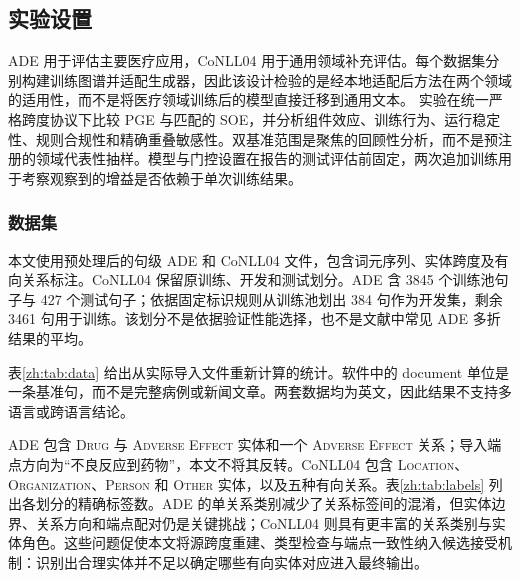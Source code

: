\documentclass[UTF8,a4paper,twocolumn,10pt]{ctexart}
\begin{document}
\subsection{实验设置}
ADE 用于评估主要医疗应用，CoNLL04 用于通用领域补充评估。每个数据集分别构建训练图谱并适配生成器，因此该设计检验的是经本地适配后方法在两个领域的适用性，而不是将医疗领域训练后的模型直接迁移到通用文本。
实验在统一严格跨度协议下比较 PGE 与匹配的 SOE，并分析组件效应、训练行为、运行稳定性、规则合规性和精确重叠敏感性。双基准范围是聚焦的回顾性分析，而不是预注册的领域代表性抽样。模型与门控设置在报告的测试评估前固定，两次追加训练用于考察观察到的增益是否依赖于单次训练结果。

\subsubsection{数据集}
本文使用预处理后的句级 ADE 和 CoNLL04 文件，包含词元序列、实体跨度及有向关系标注。CoNLL04 保留原训练、开发和测试划分。ADE 含 3845 个训练池句子与 427 个测试句子；依据固定标识规则从训练池划出 384 句作为开发集，剩余 3461 句用于训练。该划分不是依据验证性能选择，也不是文献中常见 ADE 多折结果的平均。

表\ref{zh:tab:data} 给出从实际导入文件重新计算的统计。软件中的 document 单位是一条基准句，而不是完整病例或新闻文章。两套数据均为英文，因此结果不支持多语言或跨语言结论。

\begin{table}[t]
\centering\small
\caption{实际实验划分的数据清单。长度为重建源文本的空白分词数。}
\label{zh:tab:data}
\resizebox{\textwidth}{!}{}
\end{table}

ADE 包含 \textsc{Drug} 与 \textsc{Adverse Effect} 实体和一个 \textsc{Adverse Effect} 关系；导入端点方向为“不良反应到药物”，本文不将其反转。CoNLL04 包含 \textsc{Location}、\textsc{Organization}、\textsc{Person} 和 \textsc{Other} 实体，以及五种有向关系。表\ref{zh:tab:labels} 列出各划分的精确标签数。ADE 的单关系类别减少了关系标签间的混淆，但实体边界、关系方向和端点配对仍是关键挑战；CoNLL04 则具有更丰富的关系类别与实体角色。这些问题促使本文将源跨度重建、类型检查与端点一致性纳入候选接受机制：识别出合理实体并不足以确定哪些有向实体对应进入最终输出。

\begin{table}[t]
\centering\small
\caption{导入文件中各划分的实体与关系标注数量。}
\label{zh:tab:labels}
\resizebox{\textwidth}{!}{}
\end{table}
\end{document}
